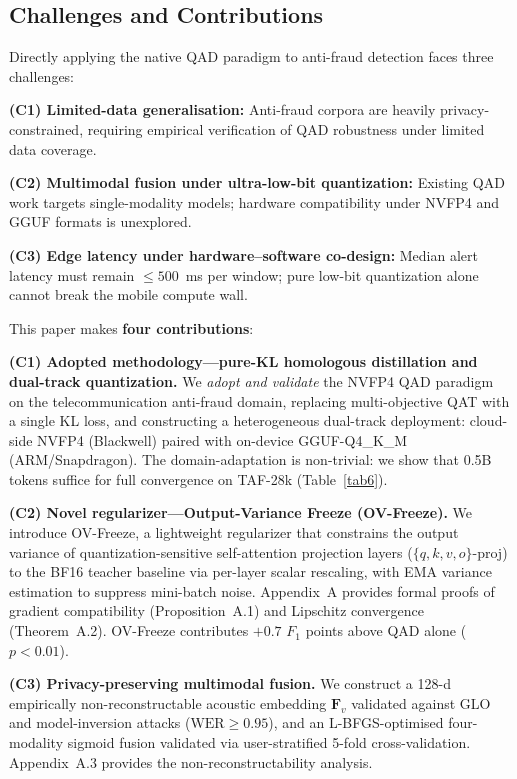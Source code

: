\documentclass[lettersize,journal]{IEEEtran}
\begin{document}
\subsection{Challenges and Contributions}

Directly applying the native QAD paradigm to anti-fraud detection
faces three challenges:

\textbf{(C1) Limited-data generalisation:} Anti-fraud corpora are
heavily privacy-constrained, requiring empirical verification of
QAD robustness under limited data coverage.

\textbf{(C2) Multimodal fusion under ultra-low-bit quantization:}
Existing QAD work targets single-modality models; hardware
compatibility under NVFP4 and GGUF formats is unexplored.

\textbf{(C3) Edge latency under hardware--software co-design:}
Median alert latency must remain $\le 500$~ms per window; pure
low-bit quantization alone cannot break the mobile compute wall.

This paper makes \textbf{four contributions}:

\textbf{(C1) Adopted methodology---pure-KL homologous distillation
and dual-track quantization.} We \emph{adopt and validate} the
NVFP4 QAD paradigm~\cite{3} on the telecommunication anti-fraud
domain, replacing multi-objective QAT with a single KL loss, and
constructing a heterogeneous dual-track deployment: cloud-side NVFP4
(Blackwell) paired with on-device GGUF-Q4\_K\_M (ARM/Snapdragon).
The domain-adaptation is non-trivial: we show that 0.5B tokens
suffice for full convergence on TAF-28k (Table~\ref{tab6}).

\textbf{(C2) Novel regularizer---Output-Variance Freeze (OV-Freeze).}
We introduce OV-Freeze, a lightweight regularizer that constrains the
output variance of quantization-sensitive self-attention projection
layers ($\{q,k,v,o\}$-proj) to the BF16 teacher baseline via
per-layer scalar rescaling, with EMA variance estimation to suppress
mini-batch noise.  Appendix~A provides formal proofs of gradient
compatibility (Proposition~A.1) and Lipschitz convergence
(Theorem~A.2).  OV-Freeze contributes $+0.7$ $F_1$ points above QAD
alone ($p < 0.01$).

\textbf{(C3) Privacy-preserving multimodal fusion.} We construct a
128-d empirically non-reconstructable acoustic embedding $\bm{F}_v$
validated against GLO and model-inversion attacks ($\text{WER}
\ge 0.95$), and an L-BFGS-optimised four-modality sigmoid fusion
validated via user-stratified 5-fold cross-validation.  Appendix~A.3
provides the non-reconstructability analysis.
\end{document}
